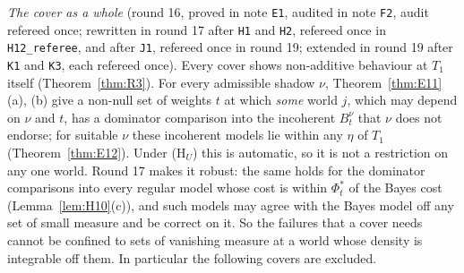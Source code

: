 \documentclass[11pt]{article}
\theoremstyle{definition}
\theoremstyle{remark}
\newcommand{\src}[1]{\texttt{#1}}
\begin{document}
\emph{The cover as a whole} (round 16, proved in note \src{E1}, audited in note \src{F2}, audit refereed once; rewritten in round 17 after \src{H1} and \src{H2}, refereed once in \src{H12\_referee}, and after \src{J1}, refereed once in round 19; extended in round 19 after \src{K1} and \src{K3}, each refereed once). Every cover shows non-additive behaviour at $T_1$ itself (Theorem~\ref{thm:R3}). For every admissible shadow $\nu$, Theorem~\ref{thm:E11}(a), (b) give a non-null set of weights $t$ at which \emph{some} world $j$, which may depend on $\nu$ and $t$, has a dominator comparison into the incoherent $B^\nu_t$ that $\nu$ does not endorse; for suitable $\nu$ these incoherent models lie within any $\eta$ of $T_1$ (Theorem~\ref{thm:E12}). Under (H$_U$) this is automatic, so it is not a restriction on any one world. Round 17 makes it robust: the same holds for the dominator comparisons into every regular model whose cost is within $\Phi^*_t$ of the Bayes cost (Lemma~\ref{lem:H10}(c)), and such models may agree with the Bayes model off any set of small measure and be correct on it. So the failures that a cover needs cannot be confined to sets of vanishing measure at a world whose density is integrable off them. In particular the following covers are excluded.
\end{document}
